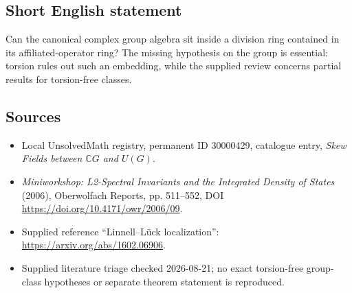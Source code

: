 \documentclass[11pt]{article}
\newcommand{\C}{\mathbb{C}}
\begin{document}
\subsection{Short English statement}
Can the canonical complex group algebra sit inside a division ring contained in its affiliated-operator ring? The missing hypothesis on the group is essential: torsion rules out such an embedding, while the supplied review concerns partial results for torsion-free classes.
\subsection{Sources}
\begin{itemize}
\item Local UnsolvedMath registry, permanent ID 30000429, catalogue entry, \emph{Skew Fields between \(\C G\) and \(U(G)\)}.
\item \emph{Miniworkshop: L2-Spectral Invariants and the Integrated Density of States} (2006), Oberwolfach Reports, pp. 511--552, DOI \url{https://doi.org/10.4171/owr/2006/09}.
\item Supplied reference ``Linnell--L\"uck localization'': \url{https://arxiv.org/abs/1602.06906}.
\item Supplied literature triage checked 2026-08-21; no exact torsion-free group-class hypotheses or separate theorem statement is reproduced.
\end{itemize}
\end{document}
